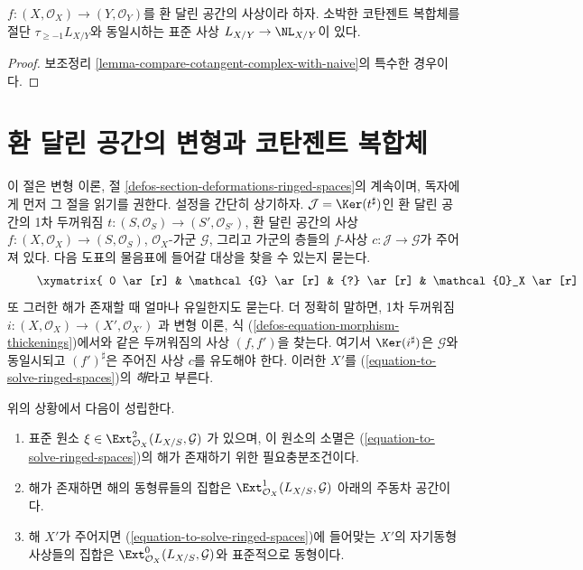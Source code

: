 \begin{lemma}
\label{lemma-compare-cotangent-complex-with-naive-ringed-spaces}
$f : (X, \mathcal{O}_X) \to (Y, \mathcal{O}_Y)$를 환 달린 공간의 사상이라
하자. 소박한 코탄젠트 복합체를 절단 $\tau_{\geq -1}L_{X/Y}$와 동일시하는
표준 사상 $L_{X/Y} \to \NL_{X/Y}$이 있다.
\end{lemma}

\begin{proof}
보조정리 \ref{lemma-compare-cotangent-complex-with-naive}의 특수한 경우이다.
\end{proof}






\section{환 달린 공간의 변형과 코탄젠트 복합체}
\label{section-deformations-ringed-spaces}

\noindent
이 절은 변형 이론, 절 \ref{defos-section-deformations-ringed-spaces}의
계속이며, 독자에게 먼저 그 절을 읽기를 권한다. 설정을 간단히 상기하자.
$\mathcal{J} = \Ker(t^\sharp)$인 환 달린 공간의 1차 두꺼워짐
$t : (S, \mathcal{O}_S) \to (S', \mathcal{O}_{S'})$, 환 달린 공간의 사상
$f : (X, \mathcal{O}_X) \to (S, \mathcal{O}_S)$, $\mathcal{O}_X$-가군
$\mathcal{G}$, 그리고 가군의 층들의 $f$-사상
$c : \mathcal{J} \to \mathcal{G}$가 주어져 있다. 다음 도표의 물음표에
들어갈 대상을 찾을 수 있는지 묻는다.
\begin{equation}
\label{equation-to-solve-ringed-spaces}
\vcenter{
\xymatrix{
0 \ar[r] & \mathcal{G} \ar[r] & {?} \ar[r] & \mathcal{O}_X \ar[r] & 0 \\
0 \ar[r] & \mathcal{J} \ar[u]^c \ar[r] & \mathcal{O}_{S'} \ar[u] \ar[r] &
\mathcal{O}_S \ar[u] \ar[r] & 0
}
}
\end{equation}
또 그러한 해가 존재할 때 얼마나 유일한지도 묻는다. 더 정확히 말하면,
1차 두꺼워짐
$i : (X, \mathcal{O}_X) \to (X', \mathcal{O}_{X'})$
과 변형 이론, 식 (\ref{defos-equation-morphism-thickenings})에서와 같은
두꺼워짐의 사상 $(f, f')$을 찾는다. 여기서 $\Ker(i^\sharp)$은
$\mathcal{G}$와 동일시되고 $(f')^\sharp$은 주어진 사상 $c$를 유도해야
한다. 이러한 $X'$를 (\ref{equation-to-solve-ringed-spaces})의
{\it 해}라고 부른다.

\begin{lemma}
\label{lemma-find-obstruction-ringed-spaces}
위의 상황에서 다음이 성립한다.
\begin{enumerate}
\item 표준 원소
$\xi \in \Ext^2_{\mathcal{O}_X}(L_{X/S}, \mathcal{G})$
가 있으며, 이 원소의 소멸은 (\ref{equation-to-solve-ringed-spaces})의 해가
존재하기 위한 필요충분조건이다.
\item 해가 존재하면 해의 동형류들의 집합은
$\Ext^1_{\mathcal{O}_X}(L_{X/S}, \mathcal{G})$ 아래의 주동차 공간이다.
\item 해 $X'$가 주어지면 (\ref{equation-to-solve-ringed-spaces})에 들어맞는
$X'$의 자기동형사상들의 집합은
$\Ext^0_{\mathcal{O}_X}(L_{X/S}, \mathcal{G})$와 표준적으로 동형이다.
\end{enumerate}
\end{lemma}

